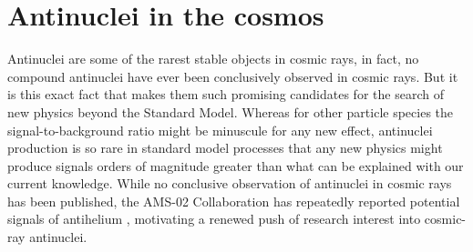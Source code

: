 \section{Antinuclei in the cosmos}\label{sec:AntinucleiInTheCosmos}
Antinuclei are some of the rarest stable objects in cosmic rays, in fact, no compound antinuclei have ever been conclusively observed in cosmic rays. But it is this exact fact that makes them such promising candidates for the search of new physics beyond the Standard Model. Whereas for other particle species the signal-to-background ratio might be minuscule for any new effect, antinuclei production is so rare in standard model processes that any new physics might produce signals orders of magnitude greater than what can be explained with our current knowledge. While no conclusive observation of antinuclei in cosmic rays has been published, the AMS-02 Collaboration has repeatedly reported potential signals of antihelium \cite{AMS_ahe_report, AMS_ahe_tease, MIAPP_AMS_dbar}, motivating a renewed push of research interest into cosmic-ray antinuclei. \\

